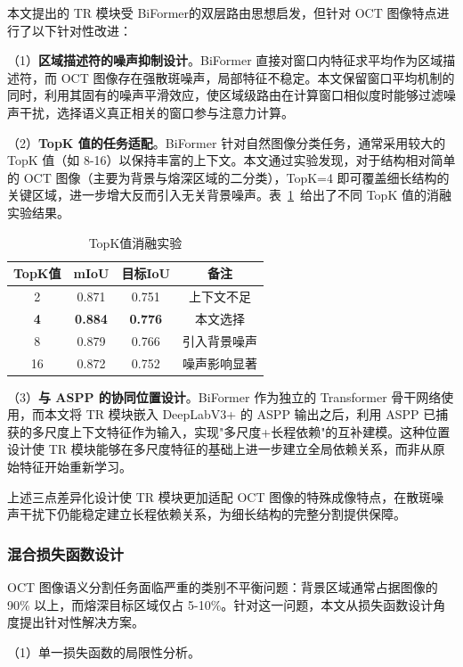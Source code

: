 本文提出的 TR 模块受 BiFormer的双层路由思想启发，但针对 OCT 图像特点进行了以下针对性改进：

（1）\textbf{区域描述符的噪声抑制设计}。BiFormer 直接对窗口内特征求平均作为区域描述符，而 OCT 图像存在强散斑噪声，局部特征不稳定。本文保留窗口平均机制的同时，利用其固有的噪声平滑效应，使区域级路由在计算窗口相似度时能够过滤噪声干扰，选择语义真正相关的窗口参与注意力计算。

（2）\textbf{TopK 值的任务适配}。BiFormer 针对自然图像分类任务，通常采用较大的 TopK 值（如 8-16）以保持丰富的上下文。本文通过实验发现，对于结构相对简单的 OCT 图像（主要为背景与熔深区域的二分类），TopK=4 即可覆盖细长结构的关键区域，进一步增大反而引入无关背景噪声。表~\ref{tab:topk_ablation}~给出了不同 TopK 值的消融实验结果。

\begin{table}[htbp]
\centering
\caption{TopK值消融实验}
\label{tab:topk_ablation}
\begin{tabular}{cccc}
\toprule
TopK值 & mIoU & 目标IoU & 备注 \\
\midrule
2 & 0.871 & 0.751 & 上下文不足 \\
\textbf{4} & \textbf{0.884} & \textbf{0.776} & 本文选择 \\
8 & 0.879 & 0.766 & 引入背景噪声 \\
16 & 0.872 & 0.752 & 噪声影响显著 \\
\bottomrule
\end{tabular}
\end{table}

（3）\textbf{与 ASPP 的协同位置设计}。BiFormer 作为独立的 Transformer 骨干网络使用，而本文将 TR 模块嵌入 DeepLabV3+ 的 ASPP 输出之后，利用 ASPP 已捕获的多尺度上下文特征作为输入，实现"多尺度+长程依赖"的互补建模。这种位置设计使 TR 模块能够在多尺度特征的基础上进一步建立全局依赖关系，而非从原始特征开始重新学习。

上述三点差异化设计使 TR 模块更加适配 OCT 图像的特殊成像特点，在散斑噪声干扰下仍能稳定建立长程依赖关系，为细长结构的完整分割提供保障。

\subsubsection{混合损失函数设计}

OCT 图像语义分割任务面临严重的类别不平衡问题：背景区域通常占据图像的 90\% 以上，而熔深目标区域仅占 5-10\%。针对这一问题，本文从损失函数设计角度提出针对性解决方案。

（1）单一损失函数的局限性分析。

